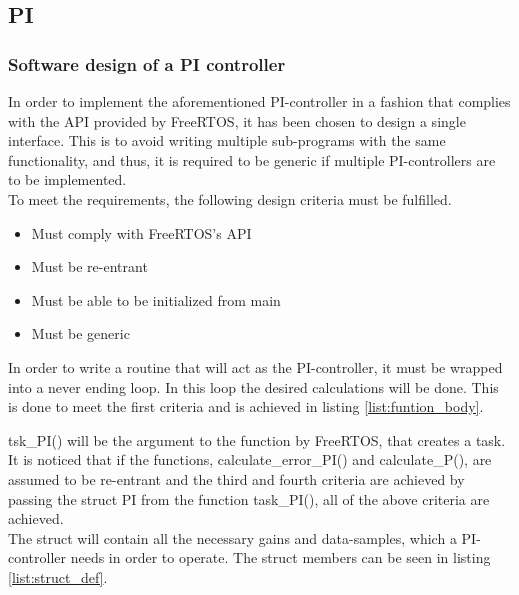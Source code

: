 \documentclass[../../../main]{subfiles}
\begin{document}
\lstset{basicstyle=\tt\scriptsize}
\subsection{PI}

\subsubsection{Software design of a PI controller}
In order to implement the aforementioned PI-controller in a fashion that complies with the API provided by FreeRTOS, it has been chosen to design a single interface.
This is to avoid writing multiple sub-programs with the same functionality, and thus, it is required to be generic if multiple PI-controllers are to be implemented.
\\

To meet the requirements, the following design criteria must be fulfilled.

\begin{itemize}
  \item Must comply with FreeRTOS's API
  \item Must be re-entrant
  \item Must be able to be initialized from main
  \item Must be generic
\end{itemize}

In order to write a routine that will act as the PI-controller, it must be wrapped into a never ending loop.
In this loop the desired calculations will be done. This is done to meet the first criteria and is achieved in listing \ref{list:funtion_body}.





tsk\_PI() will be the argument to the function by FreeRTOS, that creates a task.
It is noticed that if the functions, calculate\_error\_PI() and calculate\_P(), are assumed to be re-entrant and the third and fourth criteria are achieved by passing the struct PI from the function task\_PI(), all of the above criteria are achieved.
\\

The struct will contain all the necessary gains and data-samples, which a PI-controller needs in order to operate.
The struct members can be seen in listing \ref{list:struct_def}.

\end{document}
